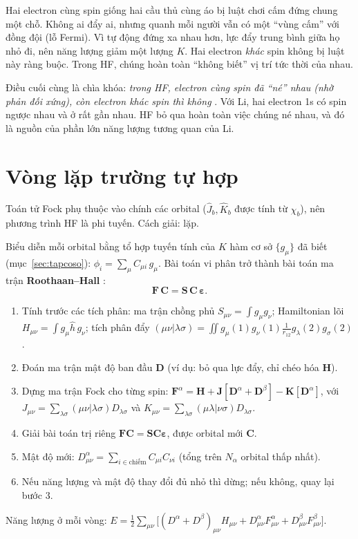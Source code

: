 \begin{eli5}
Hai electron cùng spin giống hai cầu thủ cùng áo bị luật chơi cấm đứng chung một chỗ. Không ai đẩy ai, nhưng quanh mỗi người vẫn có một ``vùng cấm'' với đồng đội (lỗ Fermi). Vì tự động đứng xa nhau hơn, lực đẩy trung bình giữa họ nhỏ đi, nên năng lượng giảm một lượng $K$. Hai electron \emph{khác} spin không bị luật này ràng buộc. Trong HF, chúng hoàn toàn ``không biết'' vị trí tức thời của nhau.
\end{eli5}

Điều cuối cùng là chìa khóa: \emph{trong HF, electron cùng spin đã ``né'' nhau (nhờ phản đối xứng), còn electron khác spin thì không} \cite{Szabo1996}. Với Li, hai electron 1s có spin ngược nhau và ở rất gần nhau. HF bỏ qua hoàn toàn việc chúng né nhau, và đó là nguồn của phần lớn năng lượng tương quan của Li.

\section{Vòng lặp trường tự hợp}

Toán tử Fock phụ thuộc vào chính các orbital ($\hat J_b,\hat K_b$ được tính từ $\chi_b$), nên phương trình HF là phi tuyến. Cách giải: lặp.

\begin{congthuc}
Biểu diễn mỗi orbital bằng tổ hợp tuyến tính của $K$ hàm cơ sở $\{g_\mu\}$ đã biết (mục~\ref{sec:tapcoso}): $\phi_i=\sum_\mu C_{\mu i}\,g_\mu$. Bài toán vi phân trở thành bài toán ma trận \textbf{Roothaan--Hall} \cite{Roothaan1951}:
\[
\mathbf F\,\mathbf C=\mathbf S\,\mathbf C\,\boldsymbol\varepsilon .
\]
\begin{enumerate}
\item Tính trước các tích phân: ma trận chồng phủ $S_{\mu\nu}=\int g_\mu g_\nu$; Hamiltonian lõi $H_{\mu\nu}=\int g_\mu\hat h\, g_\nu$; tích phân đẩy $(\mu\nu|\lambda\sigma)=\iint g_\mu(1)g_\nu(1)\frac{1}{r_{12}}g_\lambda(2)g_\sigma(2)$.
\item Đoán ma trận mật độ ban đầu $\mathbf D$ (ví dụ: bỏ qua lực đẩy, chỉ chéo hóa $\mathbf H$).
\item Dựng ma trận Fock cho từng spin: $\mathbf F^\alpha=\mathbf H+\mathbf J[\mathbf D^\alpha+\mathbf D^\beta]-\mathbf K[\mathbf D^\alpha]$, với $J_{\mu\nu}=\sum_{\lambda\sigma}(\mu\nu|\lambda\sigma)D_{\lambda\sigma}$ và $K_{\mu\nu}=\sum_{\lambda\sigma}(\mu\lambda|\nu\sigma)D_{\lambda\sigma}$.
\item Giải bài toán trị riêng $\mathbf F\mathbf C=\mathbf S\mathbf C\boldsymbol\varepsilon$, được orbital mới $\mathbf C$.
\item Mật độ mới: $D^\alpha_{\mu\nu}=\sum_{i\in\text{chiếm}}C_{\mu i}C_{\nu i}$ (tổng trên $N_\alpha$ orbital thấp nhất).
\item Nếu năng lượng và mật độ thay đổi đủ nhỏ thì dừng; nếu không, quay lại bước 3.
\end{enumerate}
Năng lượng ở mỗi vòng: $E=\tfrac12\sum_{\mu\nu}\big[(D^\alpha+D^\beta)_{\mu\nu}H_{\mu\nu}+D^\alpha_{\mu\nu}F^\alpha_{\mu\nu}+D^\beta_{\mu\nu}F^\beta_{\mu\nu}\big]$.
\end{congthuc}

